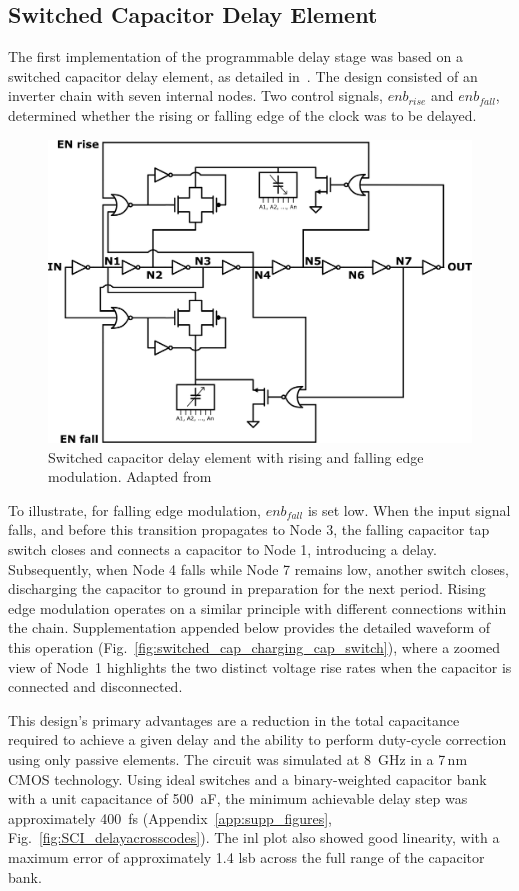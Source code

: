 \subsection{Switched Capacitor Delay Element}\label{sec:switched_cap}

The first implementation of the programmable delay stage was based on a switched capacitor delay element, as detailed in~\cite{Ramazanoglu2018switched}. The design consisted of an inverter chain with seven internal nodes. Two control signals, $enb_{rise}$ and $enb_{fall}$, determined whether the rising or falling edge of the clock was to be delayed.

\begin{figure}[htbp]
  \centering
  \includegraphics[width=0.7\linewidth]{figures/Schematics/switch_cap_SCI.png}
  \caption{Switched capacitor delay element with rising and falling edge modulation. Adapted from \cite{Ramazanoglu2018switched}}
  \label{fig:switched_cap_delay_element}
\end{figure}

To illustrate, for falling edge modulation, $enb_{fall}$ is set low. When the input signal falls, and before this transition propagates to Node 3, the falling capacitor tap switch closes and connects a capacitor to Node 1, introducing a delay. Subsequently, when Node 4 falls while Node 7 remains low, another switch closes, discharging the capacitor to ground in preparation for the next period. Rising edge modulation operates on a similar principle with different connections within the chain. Supplementation appended below provides the detailed waveform of this operation (Fig.~\ref{fig:switched_cap_charging_cap_switch}), where a zoomed view of Node~1 highlights the two distinct voltage rise rates when the capacitor is connected and disconnected.



This design's primary advantages are a reduction in the total capacitance required to achieve a given delay and the ability to perform duty-cycle correction using only passive elements. The circuit was simulated at \SI{8}{\giga\hertz} in a 7\,nm CMOS technology. Using ideal switches and a binary-weighted capacitor bank with a unit capacitance of \SI{500}{\atto\farad}, the minimum achievable delay step was approximately \SI{400}{\femto\second} (Appendix~\ref{app:supp_figures}, Fig.~\ref{fig:SCI_delayacrosscodes}). The \gls{inl} plot also showed good linearity, with a maximum error of approximately 1.4 \gls{lsb} across the full range of the capacitor bank.

